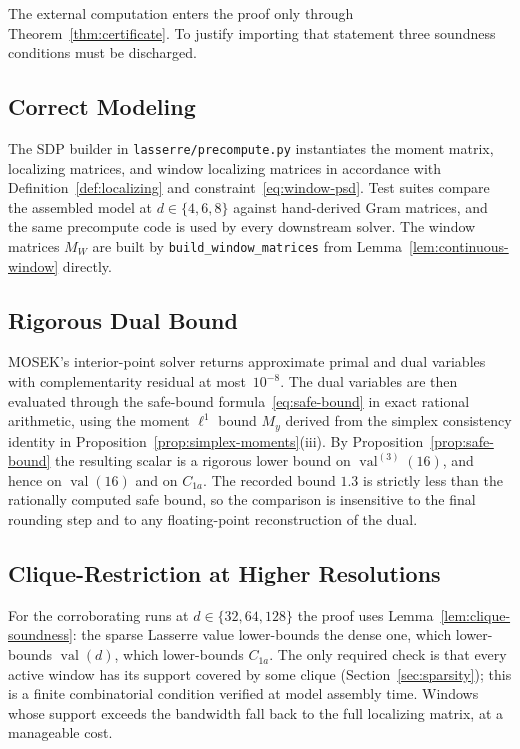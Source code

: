 \documentclass[11pt, letterpaper]{article}
\theoremstyle{paperplain}
\theoremstyle{paperdef}
\newcommand{\val}{\operatorname{val}}
\begin{document}
The external computation enters the proof only through
Theorem~\ref{thm:certificate}.  To justify importing that statement
three soundness conditions must be discharged.

\subsection{Correct Modeling}

The SDP builder in
\texttt{lasserre/precompute.py} instantiates the moment matrix,
localizing matrices, and window localizing matrices in accordance
with Definition~\ref{def:localizing} and
constraint~\eqref{eq:window-psd}.  Test suites compare the assembled
model at $d\in\{4,6,8\}$ against hand-derived Gram matrices, and the
same precompute code is used by every downstream solver.  The window
matrices $M_W$ are built by
\texttt{build\_window\_matrices} from Lemma~\ref{lem:continuous-window}
directly.

\subsection{Rigorous Dual Bound}

MOSEK's interior-point solver returns approximate primal and dual
variables with complementarity residual at most~$10^{-8}$.  The dual
variables are then evaluated through the safe-bound
formula~\eqref{eq:safe-bound} in exact rational arithmetic, using the
moment $\ell^1$ bound $M_y$ derived from the simplex consistency
identity in Proposition~\ref{prop:simplex-moments}(iii).  By
Proposition~\ref{prop:safe-bound} the resulting scalar is a rigorous
lower bound on $\val^{(3)}(16)$, and hence on $\val(16)$ and on
$C_{1a}$.  The recorded bound $1.3$ is strictly less than the
rationally computed safe bound, so the comparison is insensitive to
the final rounding step and to any floating-point reconstruction of
the dual.

\subsection{Clique-Restriction at Higher Resolutions}

For the corroborating runs at $d\in\{32,64,128\}$ the proof uses
Lemma~\ref{lem:clique-soundness}: the sparse Lasserre value lower-bounds
the dense one, which lower-bounds $\val(d)$, which lower-bounds
$C_{1a}$.  The only required check is that every active window has
its support covered by some clique (Section~\ref{sec:sparsity}); this
is a finite combinatorial condition verified at model assembly time.
Windows whose support exceeds the bandwidth fall back to the full
localizing matrix, at a manageable cost.
\end{document}
